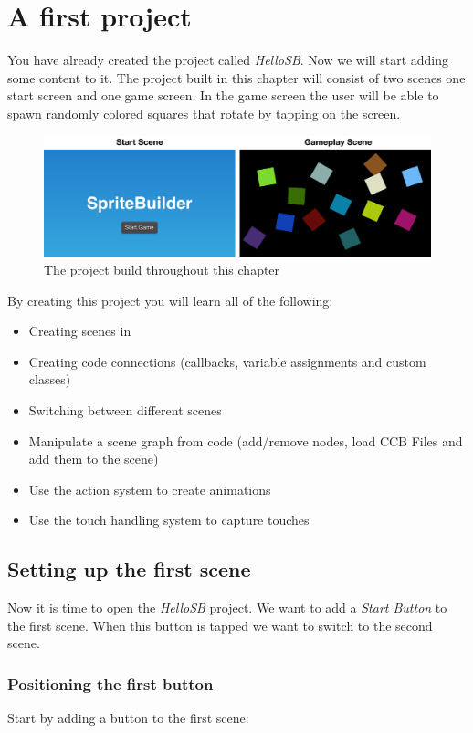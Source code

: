 \section{A first \SB{} project} 
You have already created the \SB{} project called \textit{HelloSB}. Now we will
start adding some content to it. The project built in this chapter will consist
of two scenes one start screen and one game screen. In the game screen the user will be able to spawn randomly
colored squares that rotate by tapping on the screen.
\begin{figure}[H]
		\centering
		\includegraphics[width=0.9\linewidth]{images/firstproject/first_project.png}
		\caption{The project build throughout this chapter}
\end{figure}
By creating this project you will learn all of the following:
\begin{itemize}
  \item Creating scenes in \SB{}
  \item Creating code connections (callbacks, variable assignments and custom
  classes)
  \item Switching between different scenes
  \item Manipulate a scene graph from code (add/remove nodes, load CCB Files and
  add them to the scene)
  \item Use the \cocos{} action system to create animations
  \item Use the \cocos{} touch handling system to capture touches
\end{itemize}

\subsection{Setting up the first scene}
Now it is time to open the \textit{HelloSB} \SB{} project. We want to add a
\textit{Start Button} to the first scene. When this button is tapped we want to
switch to the second scene. 

\subsubsection{Positioning the first button}
Start by adding a button to the first scene:


